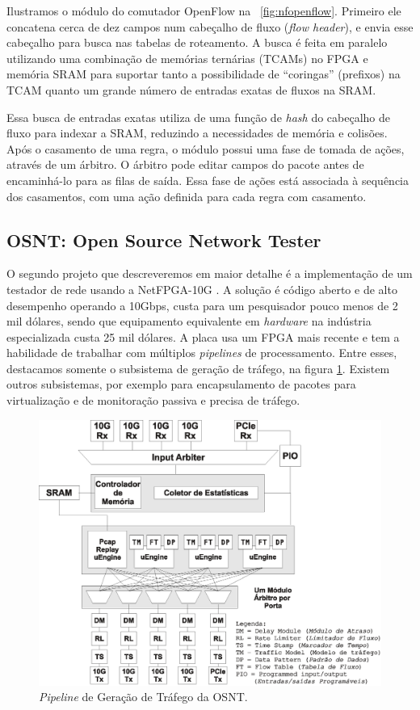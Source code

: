 Ilustramos o módulo  do comutador OpenFlow na
\figstr~\ref{fig:nfopenflow}.  Primeiro ele concatena cerca de dez
campos num cabeçalho de fluxo (\emph{flow header}), e envia esse
cabeçalho para busca nas tabelas de roteamento. A busca é feita em
paralelo utilizando uma combinação de memórias ternárias (TCAMs) no FPGA
e memória SRAM para suportar tanto a possibilidade de ``coringas''
(prefixos) na TCAM quanto um grande número de entradas exatas de fluxos
na SRAM.

Essa busca de entradas exatas utiliza de uma função de \emph{hash} do
cabeçalho de fluxo para indexar a SRAM, reduzindo a necessidades de
memória e colisões. Após o casamento de uma regra, o módulo possui uma
fase de tomada de ações, através de um árbitro.  O árbitro pode editar
campos do pacote antes de encaminhá-lo para as filas de saída. Essa fase
de ações está associada à sequência dos casamentos, com uma ação
definida para cada regra com casamento.

\subsection{OSNT: Open Source Network Tester}

O segundo projeto que descreveremos em maior detalhe é a implementação de um testador de rede usando a NetFPGA-10G \cite{shahbaz2013arch}. A solução é código aberto e de alto desempenho operando a 10Gbps, custa para um pesquisador pouco menos de 2 mil dólares, sendo que equipamento equivalente em \textit{hardware} na indústria especializada custa 25 mil dólares. A placa usa um FPGA mais recente e tem a habilidade de trabalhar com múltiplos \textit{pipelines} de processamento. Entre esses, destacamos somente o subsistema de geração de tráfego, na figura \ref{fig:osnt1}. Existem outros subsistemas, por exemplo para encapsulamento de pacotes para virtualização e de monitoração passiva e precisa de tráfego.

\begin{figure}[h]
\centering
\includegraphics[scale=0.5]{figures/netfpga-rev/osnt1.eps}
\caption{\emph{Pipeline} de Geração de Tráfego da OSNT.}
\label{fig:osnt1}
\end{figure}

